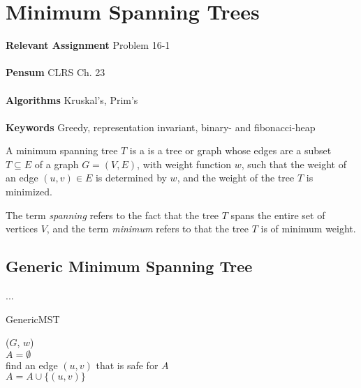 
\chapter{Minimum Spanning Trees}
\label{ch:minimumspanningtrees}

\textbf{Relevant Assignment} Problem 16-1\\\\
\textbf{Pensum} CLRS Ch. 23\\\\
\textbf{Algorithms} Kruskal's, Prim's\\\\
\textbf{Keywords} Greedy, representation invariant, binary- and fibonacci-heap
\vspace{1in}

\noindent A minimum spanning tree $T$ is a is a tree or graph whose edges are
a subset $T \subseteq E$ of a graph $G = (V, E)$, with weight function $w$,
such that the weight of an edge $(u, v) \in E$ is determined by $w$, and the
weight of the tree $T$ is minimized.

The term \textit{spanning} refers to the fact that the tree $T$ spans the
entire set of vertices $V$, and the term \textit{minimum} refers to that the
tree $T$ is of minimum weight.

\newpage
\section{Generic Minimum Spanning Tree}
...
\begin{algorithm}
	\label{alg:generic-mst}
	\caption{GenericMST}
	
	
	
	
	\BlankLine
	
	\GenericMST($G$, $w$) \\
	\Begin
	{
		$A = \emptyset$ \\
		{
			find an edge $(u, v)$ that is safe for $A$ \\
			$A = A \cup \{(u, v)\}$
		}
	}
\end{algorithm}
